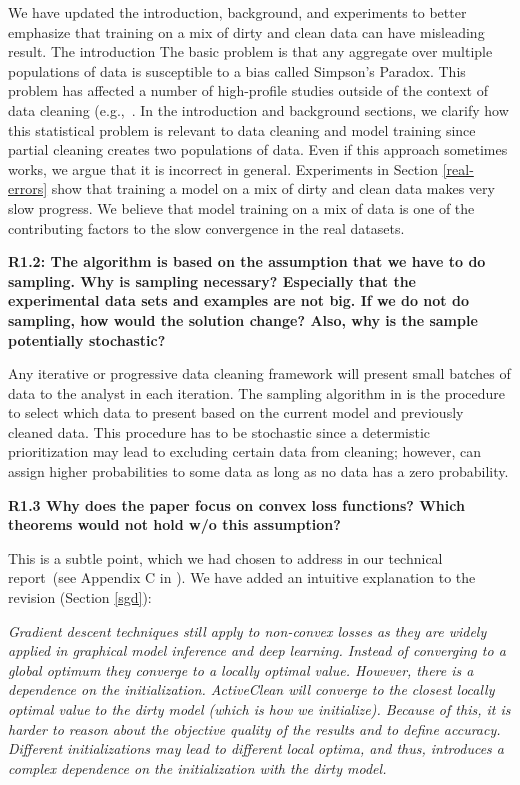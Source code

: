 \noindent We have updated the introduction, background, and experiments to better emphasize that training on a mix of dirty and clean data can have misleading result.
The introduction 
The basic problem is that any aggregate over multiple populations of data is susceptible to a bias called Simpson's Paradox. 
This problem has affected a number of high-profile studies outside of the context of data cleaning (e.g.,~\cite{bickel1975sex, charig1986comparison}. 
In the introduction and background sections, we clarify how this statistical problem is relevant to data cleaning and model training since partial cleaning creates two populations of data. 
Even if this approach sometimes works, we argue that it is incorrect in general.
Experiments in Section \ref{real-errors} show that training a model on a mix of dirty and clean data makes very slow progress. 
We believe that model training on a mix of data is one of the contributing factors to the slow convergence in the real datasets.

\vspace{0.5em}

\noindent\textbf{R1.2: The algorithm is based on the assumption that we have to do sampling. Why is sampling necessary? Especially that the experimental data sets and examples are not big. If we do not do sampling, how would the solution change? Also, why is the sample potentially stochastic?}

\noindent Any iterative or progressive data cleaning framework will present small batches of data to the analyst in each iteration. 
The sampling algorithm in \sys is the procedure to select which data to present based on the current model and previously cleaned data.
This procedure has to be stochastic since a determistic prioritization may lead to excluding certain data from cleaning; however, \sys can assign higher probabilities to some data as long as no data has a zero probability. 

\vspace{0.5em}

\noindent\textbf{R1.3 Why does the paper focus on convex loss functions? Which theorems would not hold w/o this assumption?}

\noindent This is a subtle point, which we had chosen to address in our technical report~(see Appendix C in \cite{activecleanarxiv}). We have added an intuitive explanation to the revision (Section \ref{sgd}):

\emph{Gradient descent techniques still apply to non-convex losses as they are widely applied in graphical model inference and deep learning. Instead of converging to a global optimum
they converge to a locally optimal value. However, there is a dependence on the initialization.
ActiveClean will converge to the closest locally optimal value to
the dirty model (which is how we initialize). Because of this, it is harder to reason about
the objective quality of the results and to define accuracy.
 Different initializations may lead to different local
optima, and thus, introduces a complex dependence on the
initialization with the dirty model.}

